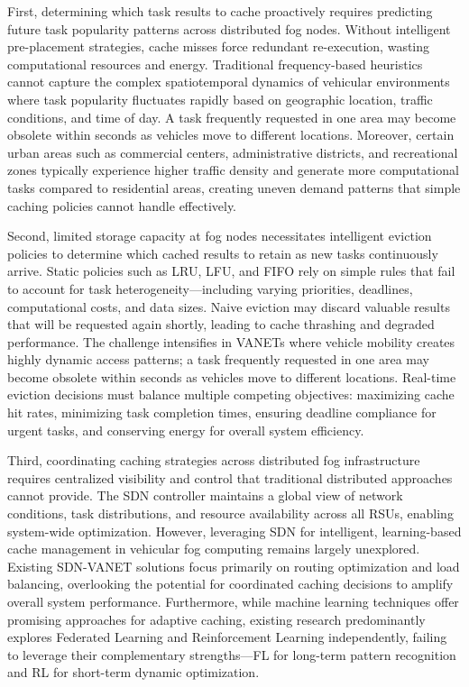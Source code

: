 First, determining which task results to cache proactively requires predicting future task popularity patterns across distributed fog nodes. Without intelligent pre-placement strategies, cache misses force redundant re-execution, wasting computational resources and energy. Traditional frequency-based heuristics cannot capture the complex spatiotemporal dynamics of vehicular environments where task popularity fluctuates rapidly based on geographic location, traffic conditions, and time of day. A task frequently requested in one area may become obsolete within seconds as vehicles move to different locations. Moreover, certain urban areas such as commercial centers, administrative districts, and recreational zones typically experience higher traffic density and generate more computational tasks compared to residential areas, creating uneven demand patterns that simple caching policies cannot handle effectively.

Second, limited storage capacity at fog nodes necessitates intelligent eviction policies to determine which cached results to retain as new tasks continuously arrive. Static policies such as LRU, LFU, and FIFO rely on simple rules that fail to account for task heterogeneity—including varying priorities, deadlines, computational costs, and data sizes. Naive eviction may discard valuable results that will be requested again shortly, leading to cache thrashing and degraded performance. The challenge intensifies in VANETs where vehicle mobility creates highly dynamic access patterns; a task frequently requested in one area may become obsolete within seconds as vehicles move to different locations. Real-time eviction decisions must balance multiple competing objectives: maximizing cache hit rates, minimizing task completion times, ensuring deadline compliance for urgent tasks, and conserving energy for overall system efficiency.

Third, coordinating caching strategies across distributed fog infrastructure requires centralized visibility and control that traditional distributed approaches cannot provide. The SDN controller maintains a global view of network conditions, task distributions, and resource availability across all RSUs, enabling system-wide optimization. However, leveraging SDN for intelligent, learning-based cache management in vehicular fog computing remains largely unexplored. Existing SDN-VANET solutions focus primarily on routing optimization and load balancing, overlooking the potential for coordinated caching decisions to amplify overall system performance. Furthermore, while machine learning techniques offer promising approaches for adaptive caching, existing research predominantly explores Federated Learning and Reinforcement Learning independently, failing to leverage their complementary strengths—FL for long-term pattern recognition and RL for short-term dynamic optimization.

